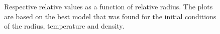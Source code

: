 \documentclass[a4paper,10pt]{article}
\begin{document}
\begin{figure}[!]
\caption{Respective relative values as a function of relative radius. The plots are based on the best model that was found for the initial conditions of the radius, temperature and density.}
\label{fig:final}
\end{figure}

\begin{figure}[!]
\centering
{} 
 \\
 \\

\end{figure}
\end{document}

